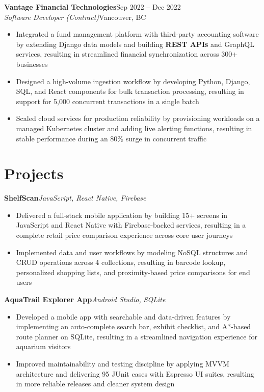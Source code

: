 \documentclass[11pt, letterpaper]{article}
\newcommand{\entry}[2]{%
    \noindent\textbf{#1}\hfill#2\\[0pt]%
}
\newcommand{\subentry}[2]{%
    \noindent\textit{#1}\hfill#2\\[-12pt]%
}
\newcommand{\project}[2]{%
    \noindent\textbf{#1}\hfill\textit{#2}\\[-12pt]%
}
\begin{document}
\entry{Vantage Financial Technologies}{Sep 2022 -- Dec 2022}
\subentry{Software Developer (Contract)}{Vancouver, BC}
\begin{itemize}
    \item Integrated a fund management platform with third-party accounting software by extending Django data models and building \textbf{REST APIs} and GraphQL services, resulting in streamlined financial synchronization across 300+ businesses
    \item Designed a high-volume ingestion workflow by developing Python, Django, SQL, and React components for bulk transaction processing, resulting in support for 5,000 concurrent transactions in a single batch
    \item Scaled cloud services for production reliability by provisioning workloads on a managed Kubernetes cluster and adding live alerting functions, resulting in stable performance during an 80\% surge in concurrent traffic
\end{itemize}

\section{Projects}

\project{ShelfScan}{JavaScript, React Native, Firebase}
  \begin{itemize}
      \item Delivered a full-stack mobile application by building 15+ screens in JavaScript and React Native with Firebase-backed services, resulting in a complete retail price comparison experience across core user journeys
      \item Implemented data and user workflows by modeling NoSQL structures and CRUD operations across 4 collections, resulting in barcode lookup, personalized shopping lists, and proximity-based price comparisons for end users
  \end{itemize}
\vspace{2pt}

\project{AquaTrail Explorer App}{Android Studio, SQLite}
  \begin{itemize}
      \item Developed a mobile app with searchable and data-driven features by implementing an auto-complete search bar, exhibit checklist, and A*-based route planner on SQLite, resulting in a streamlined navigation experience for aquarium visitors
      \item Improved maintainability and testing discipline by applying MVVM architecture and delivering 95 JUnit cases with Espresso UI suites, resulting in more reliable releases and cleaner system design
  \end{itemize}
\vspace{2pt}
\end{document}

